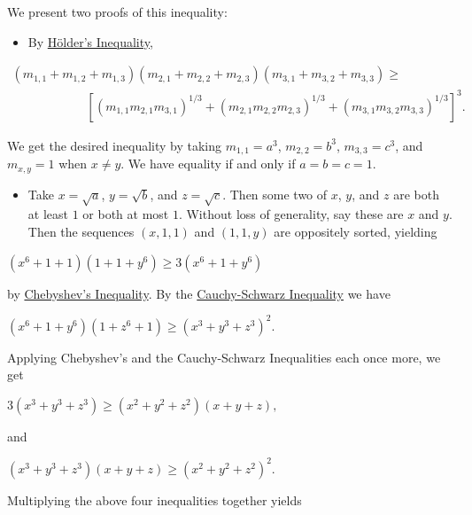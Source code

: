 \begin{enumerate}
 

 We present two proofs of this inequality:

 
            \begin{itemize}
        \item By \href{https://artofproblemsolving.com/wiki/index.php?title=H\%C3\%B6lder\%27s\_Inequality}{Hölder's Inequality},
            \end{itemize}
            $\begin{matrix}(m_{1,1} + m_{1,2} + m_{1,3})(m_{2,1} + m_{2,2} + m_{2,3})(m_{3,1} + m_{3,2} + m_{3,3}) \ge \\ \qquad \qquad \qquad\left[ (m_{1,1}m_{2,1}m_{3,1})^{1/3} + (m_{2,1}m_{2,2}m_{2,3})^{1/3} + (m_{3,1}m_{3,2}m_{3,3})^{1/3} \right] ^3.\end{matrix}$

 

 We get the desired inequality by taking $m_{1,1} = a^3$, $m_{2,2} = b^3$, $m_{3,3} = c^3$, and $m_{x,y} = 1$ when $x \neq y$. We have equality if and only if $a = b = c = 1$.

 
            \begin{itemize}
        \item Take $x = \sqrt{a}$, $y = \sqrt{b}$, and $z = \sqrt{c}$. Then some two of $x$, $y$, and $z$ are both at least $1$ or both at most $1$. Without loss of generality, say these are $x$ and $y$. Then the sequences $(x, 1, 1)$ and $(1, 1, y)$ are oppositely sorted, yielding
            \end{itemize}
            $(x^6 + 1 + 1)(1 + 1 + y^6) \ge 3(x^6 + 1 + y^6)$

 

 by \href{https://artofproblemsolving.com/wiki/index.php?title=Chebyshev\%27s\_Inequality}{Chebyshev's Inequality}. By the \href{https://artofproblemsolving.com/wiki/index.php?title=Cauchy-Schwarz\_Inequality}{Cauchy-Schwarz Inequality} we have

 $(x^6 + 1 + y^6)(1 + z^6 + 1) \ge (x^3 + y^3 + z^3)^2.$

 

 Applying Chebyshev's and the Cauchy-Schwarz Inequalities each once more, we get

 $3(x^3 + y^3 + z^3) \ge (x^2 + y^2 + z^2)(x+y+z),$

 

 and

 $(x^3 + y^3 + z^3)(x+y+z) \ge (x^2 + y^2 + z^2)^2.$

 

 Multiplying the above four inequalities together yields


\end{enumerate}
